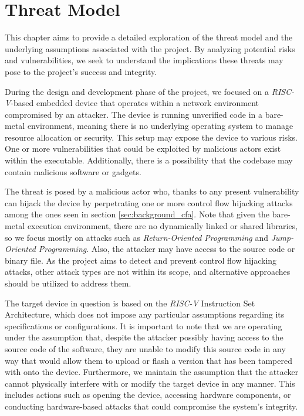 \chapter{Threat Model}
\label{cha:threatmodel}

This chapter aims to provide a detailed exploration of the threat model and the
underlying assumptions associated with the project. By analyzing potential risks
and vulnerabilities, we seek to understand the implications these threats may
pose to the project's success and integrity.

During the design and development phase of the project, we focused on a \textit{RISC-V}-based
embedded device that operates within a network environment compromised by an
attacker. The device is running unverified code in a bare-metal environment,
meaning there is no underlying operating system to manage resource allocation or
security. This setup may expose the device to various risks. One or more
vulnerabilities that could be exploited by malicious actors exist within the
executable. Additionally, there is a possibility that the codebase may contain
malicious software or gadgets.

The threat is posed by a malicious actor who, thanks to any present vulnerability
can hijack the device by perpetrating one or more control flow hijacking attacks
among the ones seen in section \ref{sec:background_cfa}. Note that given the
bare-metal execution environment, there are no dynamically linked or shared libraries,
so we focus mostly on attacks such as \textit{Return-Oriented Programming} and \textit{Jump-Oriented
Programming}. Also, the attacker may have access to the source code or binary
file. As the project aims to detect and prevent control flow hijacking attacks,
other attack types are not within its scope, and alternative approaches should be
utilized to address them.

The target device in question is based on the \textit{RISC-V} Instruction Set
Architecture, which does not impose any particular assumptions regarding its specifications
or configurations. It is important to note that we are operating under the
assumption that, despite the attacker possibly having access to the source code of
the software, they are unable to modify this source code in any way that would
allow them to upload or flash a version that has been tampered with onto the
device. Furthermore, we maintain the assumption that the attacker cannot
physically interfere with or modify the target device in any manner. This includes
actions such as opening the device, accessing hardware components, or conducting
hardware-based attacks that could compromise the system's integrity.